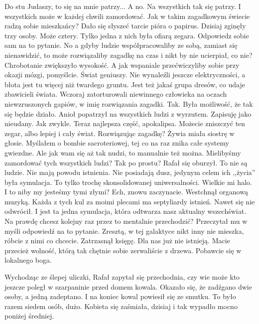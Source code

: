 \begin{dialogue}
	\ds{} Do stu Judaszy, to się na mnie patrzy...
	\ds{} A no. Na wszystkich tak się patrzy. I wszystkich może w każdej chwili zamordować.
	\ds{} Jak w takim zagadkowym świecie radzą sobie mieszkańcy? 
		\dm{} Dało się słyszeć tarcie pióra o papirus.
	\ds{} Dzisiaj zginęły trzy osoby. Może cztery. Tylko jedna z nich była ofiarą zegara. Odpowiedz sobie sam na to pytanie.
	\ds{} No a gdyby ludzie współpracowaliby ze sobą, zamiast się nienawidzić, to może rozwiązaliby zagadkę na czas i nikt by nie ucierpiał, co nie?
		\dm{} Chrobotanie zwiększyło wysokość. \dm{} A jak wspaniale przećwiczyliby sobie przy okazji mózgi, pomyślcie. Świat geniuszy.
	\ds{} Nie wynaleźli jeszcze elektryczności, a błota jest tu więcej niż twardego gruntu. Jest też jakaś grupa dresów, co udaje zbawicieli świata. 
		Wczoraj zatorturowali niewinnego człowieka na oczach niewzruszonych gapiów, w imię rozwiązania zagadki.
	\ds{} Tak. Była możliwość, że tak się będzie działo. \dm{} Anioł popatrzył na wszystkich ludzi z wyrzutem. \dm{} Zapisuję jako nieudany. Jak zwykle. Teraz najlepsza część, apokalipsa. Możecie zniszczyć ten zegar, albo lepiej i cały świat.
	\ds{} Rozwiązując zagadkę?
		\dm{} Żywia miała siostrę w głosie.
	\ds{} Myślałem o bombie sacroteriowej, tej co na raz znika całe systemy gwiezdne. Ale jak wam się aż tak nudzi, to manualnie też można.
	\ds{} Mielibyśmy zamordować tych wszystkich ludzi? Tak po prostu? \dm{} Rafał się oburzył.
	\ds{} To nie są ludzie. Nie mają powodu istnienia. Nie posiadają dusz, jedynym celem ich ,,życia'' była symulacja. To tylko trochę skonsolidowanej uniwersalności. Wielkie mi halo.
	\ds{} I to niby my jesteśmy tymi złymi?
	\ds{} Ech, znowu zaczynacie. 
		\dm{} Westchnął organową muzyką.
		\dm{} Każda z tych kul za moimi plecami ma septyliardy istnień. 
		\dm{} Nawet się nie odwrócił. 
		\dm{} I jest ta jedna symulacja, która odtwarza nasz aktualny wszechświat. Na prawdę chcesz kolejny raz przez to mentalnie przechodzić?
		\dm{} Przeczytał mu w myśli odpowiedź na to pytanie.
		\dm{} Zresztą, w tej galaktyce nikt inny nie mieszka, róbcie z nimi co chcecie.
		\dm{} Zatrzasnął księgę. 
		\dm{} Dla nas już nie istnieją. Macie przecież wolność, którą tak chętnie sobie zerwaliście z drzewa. Pobawcie się w lokalnego boga.
\end{dialogue}

Wychodząc ze ślepej uliczki, Rafał zapytał się przechodnia, czy wie może kto jeszcze poległ w szarpaninie przed domem kowala. 
Okazało się, że zadźgano dwie osoby, a jedną zadeptano. I na koniec kowal powiesił się ze smutku. To było razem siedem osób, dużo.
Kobieta się zaśmiała, dzisiaj i tak wypadło mocno poniżej średniej.

